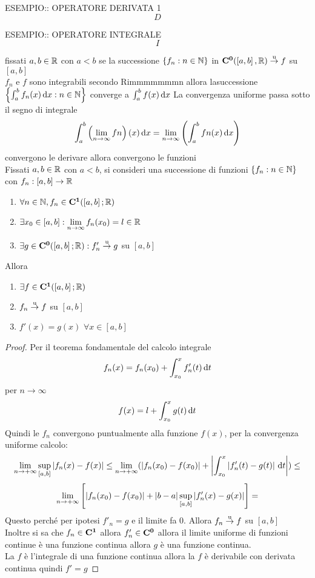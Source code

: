ESEMPIO:: OPERATORE DERIVATA 1\\
\[D\]

ESEMPIO:: OPERATORE INTEGRALE\\
\[I\]

\proposition
fissati $a,b\in \mathbb{R}$ con $a<b$ se la successione $\left\{f_n:n\in\mathbb{N}\right\}$ in $\mathbf{C^{0}}(\left[a,b\right], \mathbb{R}) \overset{\text{u}}{\to} f$ su $\left[a,b\right]$\\
$f_n$ e $f$ sono integrabili secondo Rimmmmmmmn allora lasuccessione $\left\{\int_a^bf_n(x)\,\mathrm{d}{x}:n\in\mathbb{N}\right\}$ converge a $\int_a^bf(x)\,\mathrm{d}{x}$
\observation
La convergenza uniforme passa sotto il segno di integrale
\[\int_a^b\left(\lim\limits_{n\to\infty}fn\right)(x)\,\mathrm{d}{x}=\lim\limits_{n\to\infty}\left(\int_a^bfn(x)\,\mathrm{d}{x}\right)\]
\proposition convergono le derivare allora convergono le funzioni\\
Fissati $a,b\in \mathbb{R}$ con $a<b$, si consideri una successione di funzioni $\left\{f_n:n\in\mathbb{N}\right\}$ con $f_n:\left[a,b\right]\to \mathbb{R}$
\begin{enumerate}
	\item $\forall n\in\mathbb{N}, f_n\in \mathbf{C^{1}}(\left[a,b\right]; \mathbb{R})$
	\item $\exists x_0\in\left[a,b\right]: \lim\limits_{n\to\infty}f_n(x_0)=l\in \mathbb{R}$
	\item $\exists g \in \mathbf{C^{0}}(\left[a,b\right]; \mathbb{R}):f'_n \overset{\text{u}}{\to} g$ su $\left[a,b\right]$
\end{enumerate}
Allora
\begin{enumerate}
	\item $\exists f\in \mathbf{C^{1}}(\left[a,b\right]; \mathbb{R})$
	\item $f_n \overset{\text{u}}{\to} f$ su $\left[a,b\right]$
	\item $f'(x)=g(x)$ $\forall x\in\left[a,b\right]$
\end{enumerate}
\begin{proof}
	Per il teorema fondamentale del calcolo integrale
	\[f_n(x)=f_n(x_0)+\int_{x_0}^{x}f_n'(t)\,\mathrm{d}{t}\]
	per $n\to\infty$
	\[f(x)=l+\int_{x_0}^{x}g(t)\,\mathrm{d}{t}\]
	Quindi le $f_n$ convergono puntualmente alla funzione $f(x)$, per la convergenza uniforme calcolo:
	\[ \lim\limits_{n\to+\infty}\sup\limits_{\left[a,b\right]}\left|f_n(x)-f(x)\right|\le\lim\limits_{n\to+\infty}(\left|f_n(x_0)-f(x_0)\right|+\left|\int_{x_0}^x \left|f_n'(t)-g(t)\right|\,\mathrm{d}{t}\right|)\le\]
	\[\lim\limits_{n\to+\infty}\left[ \left|f_n(x_0)-f(x_0)\right|+\left|b-a\right|\sup\limits_{\left[a,b\right]}\left|f_n'(x)-g(x)\right| \right] = \]
	Questo perché per ipotesi $f'_n=g$ e il limite fa $0$.
	Allora $f_n \overset{\text{u}}{\to} f$ su $\left[a,b\right]$\\
	Inoltre si sa che $f_n\in \mathbf{C^{1}}$ allora $f_n'\in \mathbf{C^{0}}$ allora il limite uniforme di funzioni continue è una funzione continua allora $g$ è una funzione continua.\\
	La $f$ è l'integrale di una funzione continua allora la $f$ è derivabile con derivata continua quindi $f'=g$
\end{proof}
